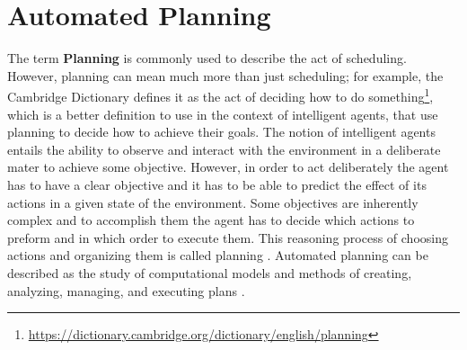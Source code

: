 \section{Automated Planning}

The term \textbf{Planning} is commonly used to describe the act of 
scheduling. However, planning can mean much more than just
scheduling; for example, the Cambridge Dictionary defines 
it as the act of deciding how to do something\footnote{\url{https://dictionary.cambridge.org/dictionary/english/planning}}, 
which is a better definition to use in the context of intelligent agents, that 
use planning to decide how to achieve their goals. The notion of intelligent agents entails the ability to observe and interact 
with the environment in a deliberate mater to achieve some objective. 
However, in order to act deliberately the agent has to have a clear objective 
and it has to be able to predict the effect of its actions in a given state of 
the environment.  Some objectives are inherently complex and to accomplish them 
the agent has to decide which actions to preform and in which order to execute 
them. This reasoning process of choosing actions and organizing them 
is called planning \cite{AutomatedPlanningTheoryghallab2006}. 
Automated planning can be described as the study of computational models and methods 
of creating, analyzing, managing, and 
executing plans \cite{IntroductionPlanningDomainhaslum2019}.



